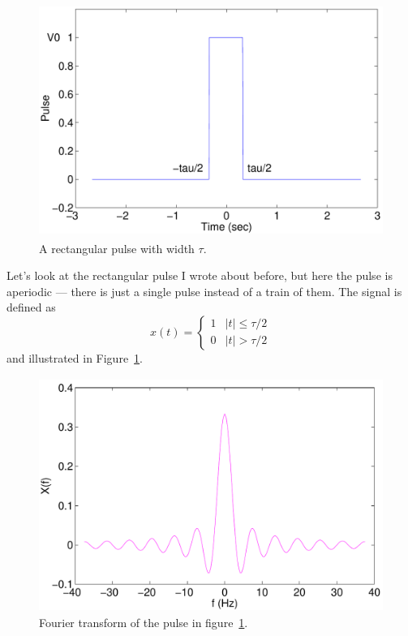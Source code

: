 \begin{figure}
\centerline{\includegraphics[height=3in]{ch-fft/ft_pulse}}
\caption{A rectangular pulse with width $\tau$. 
\label{fig:ft-pulse-x}}
\end{figure}

Let's look at the rectangular pulse I wrote about before, but here
the pulse is aperiodic --- there is just a single pulse instead of a
train of them. The signal is defined as
\begin{equation}
x(t) = \left\{\begin{array}{ll}
                        1 & |t|\leq \tau/2 \\
                        0   & |t| > \tau/2
                        \end{array}\right.
\end{equation}
and illustrated in Figure~\ref{fig:ft-pulse-x}.  

\begin{figure}
\centerline{\includegraphics[height=3in]{ch-fft/ft_pulseX}}
\caption{Fourier transform of the pulse in
figure~\protect\ref{fig:ft-pulse-x}.
\label{fig:ft-pulse-X}}
\end{figure}

